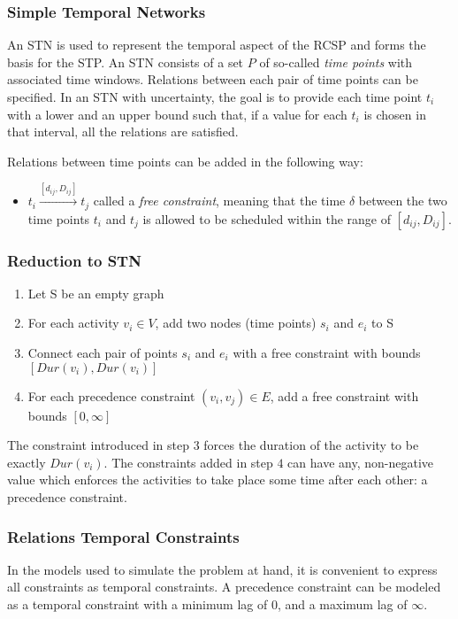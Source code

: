 \documentclass{article}
\newcommand{\dur}[1]{\textit{Dur}(#1)} %
\begin{document}
\subsubsection{Simple Temporal Networks}
An STN is used to represent the temporal aspect of the RCSP and forms the basis for the STP.
An STN consists of a set $P$ of so-called \emph{time points} with associated time windows.
Relations between each pair of time points can be specified.
In an STN with uncertainty, the goal is to provide each time point $t_i$ with a lower and an upper bound such that, if a value for each $t_i$ is chosen in that interval, all the relations are satisfied.

Relations between time points can be added in the following way:
\begin{itemize}
\item $t_i \xrightarrow{[d_{ij},D_{ij}]} t_j$ called a \emph{free constraint}, meaning that the time $\delta$ between the two time points $t_i$ and $t_j$ is allowed to be scheduled within the range of $[d_{ij},D_{ij}]$.
\end{itemize}

\subsubsection{Reduction to STN}
\begin{enumerate}
\item Let S be an empty graph
\item For each activity $v_i \in V$, add two nodes (time points) $s_i$ and $e_i$ to S
\item Connect each pair of points $s_i$ and $e_i$ with a free constraint with bounds $[\dur{v_i}, \dur{v_i}]$
\item For each precedence constraint $(v_i, v_j) \in E$, add a free constraint with bounds $[0, \infty]$
\end{enumerate}

The constraint introduced in step $3$ forces the duration of the activity to be exactly $\dur{v_i}$. The constraints added in step $4$ can have any, non-negative value which enforces the activities to take place some time after each other: a precedence constraint.

\subsubsection{Relations Temporal Constraints}
In the models used to simulate the problem at hand, it is convenient to express all constraints as temporal constraints.
A precedence constraint can be modeled as a temporal constraint with a minimum lag of $0$, and a maximum lag of $\infty$.
\end{document}
